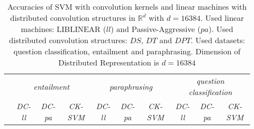 \documentclass[twoside,11pt]{article}
\def\R{\mathbb{R}}
\begin{document}
\begin{table}
\begin{tabular}{l|ccc|ccc|ccc}
 & \multicolumn{3}{|c|}{\emph{entailment}} & \multicolumn{3}{|c|}{\emph{paraphrasing}} & \multicolumn{3}{|c}{\emph{question classification}} \\
 & \emph{DC-ll} & \emph{DC-pa} & \emph{CK-SVM} & \emph{DC-ll} & \emph{DC-pa} & \emph{CK-SVM} & \emph{DC-ll} & \emph{DC-pa} & \emph{CK-SVM}\\
\hline

\hline
\end{tabular}
\caption{Accuracies of SVM with convolution kernels and linear machines with distributed convolution structures in $\R^d$ with $d=16384$. Used linear machines: LIBLINEAR ($ll$) and Passive-Aggressive ($pa$). Used distributed convolution structures: $DS$, $DT$ and $DPT$. Used datasets: question classification, entailment and paraphrasing.
Dimension of Distributed Representation is $d=16384$}
\label{tab:accuracies}
\end{table}
\end{document}
